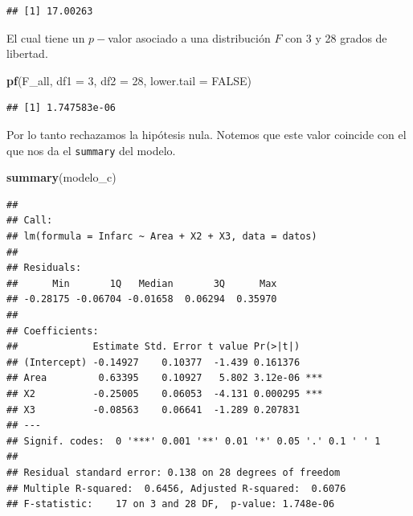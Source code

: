 \documentclass[
]{book}
\newenvironment{Shaded}{\begin{snugshade}}{\end{snugshade}}
\newcommand{\AttributeTok}[1]{\textcolor[rgb]{0.13,0.29,0.53}{#1}}
\newcommand{\ConstantTok}[1]{\textcolor[rgb]{0.56,0.35,0.01}{#1}}
\newcommand{\DecValTok}[1]{\textcolor[rgb]{0.00,0.00,0.81}{#1}}
\newcommand{\FunctionTok}[1]{\textcolor[rgb]{0.13,0.29,0.53}{\textbf{#1}}}
\newcommand{\NormalTok}[1]{#1}
\newcommand{\OtherTok}[1]{\textcolor[rgb]{0.56,0.35,0.01}{#1}}
\newcommand{\SpecialCharTok}[1]{\textcolor[rgb]{0.81,0.36,0.00}{\textbf{#1}}}
\newcommand{\StringTok}[1]{\textcolor[rgb]{0.31,0.60,0.02}{#1}}
\begin{document}
\begin{Shaded}
\end{Shaded}

\begin{verbatim}
## [1] 17.00263
\end{verbatim}

El cual tiene un \(p-\)valor asociado a una distribución \(F\) con 3 y 28 grados de libertad.

\begin{Shaded}
\begin{Highlighting}[]
\FunctionTok{pf}\NormalTok{(F\_all, }\AttributeTok{df1 =} \DecValTok{3}\NormalTok{, }\AttributeTok{df2 =} \DecValTok{28}\NormalTok{, }\AttributeTok{lower.tail =} \ConstantTok{FALSE}\NormalTok{)}
\end{Highlighting}
\end{Shaded}

\begin{verbatim}
## [1] 1.747583e-06
\end{verbatim}

Por lo tanto rechazamos la hipótesis nula. Notemos que este valor coincide con el que nos da el \texttt{summary} del modelo.

\begin{Shaded}
\begin{Highlighting}[]
\FunctionTok{summary}\NormalTok{(modelo\_c)}
\end{Highlighting}
\end{Shaded}

\begin{verbatim}
## 
## Call:
## lm(formula = Infarc ~ Area + X2 + X3, data = datos)
## 
## Residuals:
##      Min       1Q   Median       3Q      Max 
## -0.28175 -0.06704 -0.01658  0.06294  0.35970 
## 
## Coefficients:
##             Estimate Std. Error t value Pr(>|t|)    
## (Intercept) -0.14927    0.10377  -1.439 0.161376    
## Area         0.63395    0.10927   5.802 3.12e-06 ***
## X2          -0.25005    0.06053  -4.131 0.000295 ***
## X3          -0.08563    0.06641  -1.289 0.207831    
## ---
## Signif. codes:  0 '***' 0.001 '**' 0.01 '*' 0.05 '.' 0.1 ' ' 1
## 
## Residual standard error: 0.138 on 28 degrees of freedom
## Multiple R-squared:  0.6456, Adjusted R-squared:  0.6076 
## F-statistic:    17 on 3 and 28 DF,  p-value: 1.748e-06
\end{verbatim}
\end{document}
